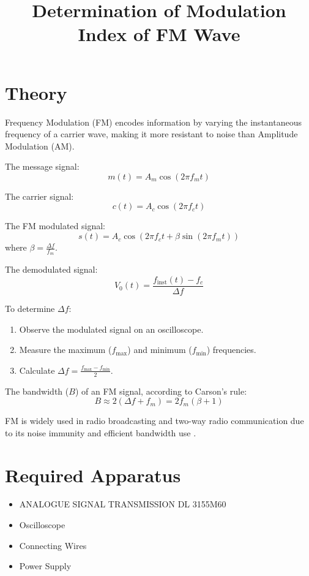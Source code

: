 \documentclass[12pt]{article}
\title{Determination of Modulation Index of FM Wave}
\author{}
\date{}
\begin{document}


\pagebreak

\tableofcontents

\pagebreak
{}
\maketitle

\section*{Theory}
Frequency Modulation (FM) encodes information by varying the instantaneous frequency of a carrier wave, making it more resistant to noise than Amplitude Modulation (AM).

The message signal:
\[
    m(t) = A_m \cos(2 \pi f_m t)
\]

The carrier signal:
\[
    c(t) = A_c \cos(2 \pi f_c t)
\]

The FM modulated signal:
\[
    s(t) = A_c \cos\left(2 \pi f_c t + \beta \sin(2 \pi f_m t)\right)
\]
where \( \beta = \frac{\Delta f}{f_m} \).

The demodulated signal:
\[
    V_{\text{0}}(t) = \frac{f_{\text{inst}}(t) - f_c}{\Delta f}
\]

To determine \( \Delta f \):
\begin{enumerate}
    \item Observe the modulated signal on an oscilloscope.
    \item Measure the maximum (\( f_{\text{max}} \)) and minimum (\( f_{\text{min}} \)) frequencies.
    \item Calculate \( \Delta f = \frac{f_{\text{max}} - f_{\text{min}}}{2} \).
\end{enumerate}

The bandwidth (\( B \)) of an FM signal, according to Carson's rule:
\[
    B \approx 2 (\Delta f + f_m) = 2 f_m (\beta + 1)
\]

FM is widely used in radio broadcasting and two-way radio communication due to its noise immunity and efficient bandwidth use \cite{haykin2008communication, proakis2007digital}.

\section*{Required Apparatus}
\begin{itemize}
    \item ANALOGUE SIGNAL TRANSMISSION DL 3155M60
    \item Oscilloscope
    \item Connecting Wires
    \item Power Supply
\end{itemize}
\end{document}
